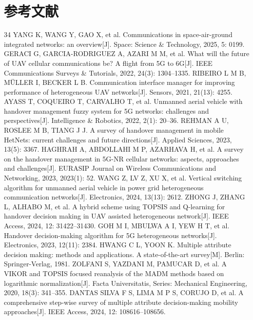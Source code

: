 \documentclass[10pt,a4paper]{ctexart}
\begin{document}
\section*{参考文献}
{\renewcommand{\refname}{}
\vspace{-2.5em}
\begin{thebibliography}{34}
 YANG K, WANG Y, GAO X, et al. Communications in space-air-ground integrated networks: an overview[J]. Space: Science \& Technology, 2025, 5: 0199.
 GERACI G, GARCIA-RODRIGUEZ A, AZARI M M, et al. What will the future of UAV cellular communications be? A flight from 5G to 6G[J]. IEEE Communications Surveys \& Tutorials, 2022, 24(3): 1304--1335.
 RIBEIRO L M B, MÜLLER I, BECKER L B. Communication interface manager for improving performance of heterogeneous UAV networks[J]. Sensors, 2021, 21(13): 4255.
 AYASS T, COQUEIRO T, CARVALHO T, et al. Unmanned aerial vehicle with handover management fuzzy system for 5G networks: challenges and perspectives[J]. Intelligence \& Robotics, 2022, 2(1): 20--36.
 REHMAN A U, ROSLEE M B, TIANG J J. A survey of handover management in mobile HetNets: current challenges and future directions[J]. Applied Sciences, 2023, 13(5): 3367.
 HAGHRAH A, ABDOLLAHI M P, AZARHAVA H, et al. A survey on the handover management in 5G-NR cellular networks: aspects, approaches and challenges[J]. EURASIP Journal on Wireless Communications and Networking, 2023, 2023(1): 52.
 WANG Z, LV Z, XU X, et al. Vertical switching algorithm for unmanned aerial vehicle in power grid heterogeneous communication networks[J]. Electronics, 2024, 13(13): 2612.
 ZHONG J, ZHANG L, ALHABO M, et al. A hybrid scheme using TOPSIS and Q-learning for handover decision making in UAV assisted heterogeneous network[J]. IEEE Access, 2024, 12: 31422--31430.
 GOH M I, MBULWA A I, YEW H T, et al. Handover decision-making algorithm for 5G heterogeneous networks[J]. Electronics, 2023, 12(11): 2384.
 HWANG C L, YOON K. Multiple attribute decision making: methods and applications. A state-of-the-art survey[M]. Berlin: Springer-Verlag, 1981.
 ZOLFANI S, YAZDANI M, PAMUCAR D, et al. A VIKOR and TOPSIS focused reanalysis of the MADM methods based on logarithmic normalization[J]. Facta Universitatis, Series: Mechanical Engineering, 2020, 18(3): 341--355.
 DANTAS SILVA F S, LIMA M P S, CORUJO D, et al. A comprehensive step-wise survey of multiple attribute decision-making mobility approaches[J]. IEEE Access, 2024, 12: 108616--108656.

\end{thebibliography}}
\end{document}
